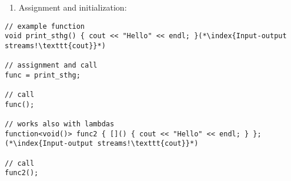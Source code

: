 \documentclass[10pt]{article}
\begin{document}
\begin{enumerate}
\item[] Assignment and initialization:
\end{enumerate}
\begin{lstlisting}
// example function
void print_sthg() { cout << "Hello" << endl; }(*\index{Input-output streams!\texttt{cout}}*)

// assignment and call
func = print_sthg;

// call
func();

// works also with lambdas
function<void()> func2 { []() { cout << "Hello" << endl; } };(*\index{Input-output streams!\texttt{cout}}*)

// call
func2();
\end{lstlisting}
%
%
\end{document}
